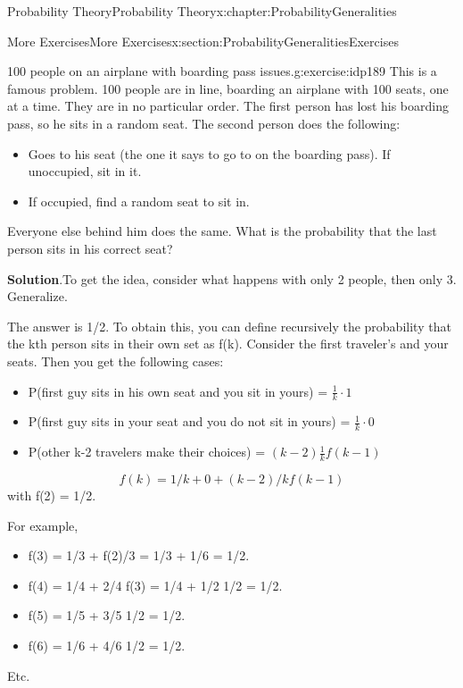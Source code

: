 \documentclass[oneside,10pt,]{book}
\newcommand{\blocktitlefont}{\relax}
\numberwithin{equation}{section}
\begin{document}
\begin{chapterptx}{Probability Theory}{}{Probability Theory}{}{}{x:chapter:ProbabilityGeneralities}
\begin{sectionptx}{More Exercises}{}{More Exercises}{}{}{x:section:ProbabilityGeneralitiesExercises}
\begin{inlineexercise}{100 people on an airplane with boarding pass issues.}{g:exercise:idp189}
This is a famous problem.  100 people are in line, boarding an airplane with 100 seats, one at a time. They are in no particular order. The first person has lost his boarding pass, so he sits in a random seat. The second person does the following:%
\begin{itemize}[label=\textbullet]
\item{}Goes to his seat (the one it says to go to on the boarding pass). If unoccupied, sit in it.%
\item{}If occupied, find a random seat to sit in.%
\end{itemize}
Everyone else behind him does the same. What is the probability that the last person sits in his correct seat?%
\par\smallskip%
\noindent\textbf{\blocktitlefont Solution}.\hypertarget{g:solution:idp190}{}\quad{}To get the idea, consider what happens with only 2 people, then only 3. Generalize.%
\par
The answer is 1\slash{}2. To obtain this, you can define recursively the probability that the kth person sits in their own set as f(k).  Consider the first traveler's and your seats. Then you get the following cases:%
\begin{itemize}[label=\textbullet]
\item{}P(first guy sits in his own seat and you sit in yours) = \(\frac{1}{k} \cdot 1\)%
\item{}P(first guy sits in your seat and you do not sit in yours) = \(\frac{1}{k} \cdot 0\)%
\item{}P(other k-2 travelers make their choices) = \((k-2) \frac{1}{k} f(k-1)\)%
\end{itemize}
%
\begin{equation*}
f(k) = 1/k + 0 + (k-2)/k f(k-1)
\end{equation*}
with f(2) = 1\slash{}2.%
\par
For example,%
\begin{itemize}[label=\textbullet]
\item{}f(3) = 1\slash{}3 + f(2)\slash{}3 = 1\slash{}3 + 1\slash{}6 = 1\slash{}2.%
\item{}f(4) = 1\slash{}4 + 2\slash{}4 f(3) = 1\slash{}4 + 1\slash{}2 1\slash{}2 = 1\slash{}2.%
\item{}f(5) = 1\slash{}5 + 3\slash{}5 1\slash{}2 = 1\slash{}2.%
\item{}f(6) = 1\slash{}6 + 4\slash{}6 1\slash{}2 = 1\slash{}2.%
\end{itemize}
Etc.%
\end{inlineexercise}%

\end{sectionptx}
\end{chapterptx}
\end{document}
